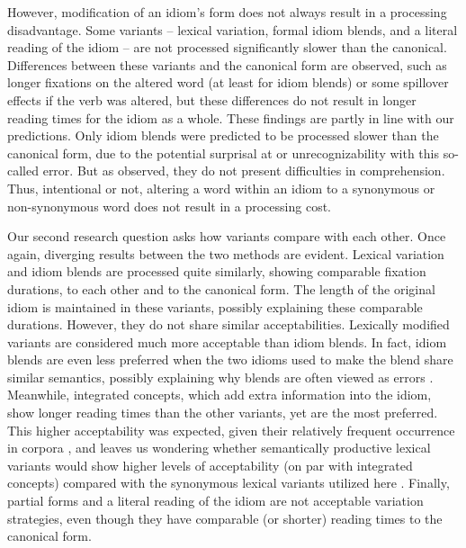 \documentclass[output=paper,modfonts,nonflat]{langsci/langscibook}
\begin{document}
However, modification of an idiom's form does not always result in a processing disadvantage. Some variants -- lexical variation, formal idiom blends, and a literal reading of the idiom -- are not processed significantly slower than the canonical. Differences between these variants and the canonical form are observed, such as longer fixations on the altered word (at least for idiom blends) or some spillover effects if the verb was altered, but these differences do not result in longer reading times for the idiom as a whole. These findings are partly in line with our predictions. Only idiom blends were predicted to be processed slower than the canonical form, due to the potential surprisal at or unrecognizability with this so-called error. But as observed, they do not present difficulties in comprehension. Thus, intentional or not, altering a word within an idiom to a synonymous or non-synonymous word does not result in a processing cost.

Our second research question asks how variants compare with each other. Once again, diverging results between the two methods are evident.  Lexical variation and idiom blends are processed quite similarly, showing comparable fixation durations, to each other and to the canonical form. The length of the original idiom is maintained in these variants, possibly explaining these comparable durations. However, they do not share similar acceptabilities. Lexically modified variants are considered much more acceptable than idiom blends. In fact, idiom blends are even less preferred when the two idioms used to make the blend share similar semantics, possibly explaining why blends are often viewed as errors \citep{Fay1982, CuttingBock1997}. Meanwhile, integrated concepts, which add extra information into the idiom, show longer reading times than the other variants, yet are the most preferred. This higher acceptability was expected, given their relatively frequent occurrence in corpora \citep{Moon1998, Schroder2013}, and leaves us wondering whether semantically productive lexical variants \citep[cf.][]{McGloneEtAl1994} would show higher levels of acceptability (on par with integrated concepts) compared with the synonymous lexical variants utilized here \citep[following][]{GibbsEtAl1989}. Finally, partial forms and a literal reading of the idiom are not acceptable variation strategies, even though they have comparable (or shorter) reading times to the canonical form.
\end{document}
